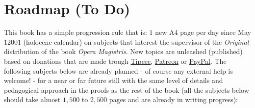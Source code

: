 	\section{Roadmap (To Do)}
	This book has a simple progression rule that is: $1$ new A4 page per day since May 12001 (holocene calendar) on subjects that interest the supervisor of the \textit{Original} distribution of the book \textit{Opera Magistris}. New topics are unleashed (published) based on donations that are made trough \href{https://www.tipeee.com/elements-of-applied-mathematics}{Tipeee}, \href{https://www.patreon.com/sciences}{Patreon} or \href{https://www.paypal.me/scientificevolution}{PayPal}. The following subjects below are already planned - of course any external help is welcome! - for a near or far future still with the same level of details and pedagogical approach in the proofs as the rest of the book (all the subjects below should take almost $1,500$ to $2,500$ pages and are already in writing progress):
